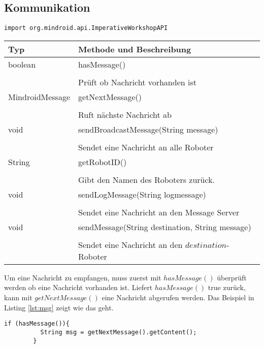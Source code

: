 	\subsection{Kommunikation}
				\begin{center}\texttt{import org.mindroid.api.ImperativeWorkshopAPI}\end{center}
		\begin{table}[htbp]
		\begin{tabular}{|p{} p{}|}
		\hline
		\textbf{Typ} & \textbf{Methode und Beschreibung} \\ \hline
		boolean & hasMessage() \\ 
				&\\
		& Prüft ob Nachricht vorhanden ist \\ \hline
		MindroidMessage & getNextMessage() \\ 
				&\\
		& Ruft nächste Nachricht ab \\ \hline		
		void & sendBroadcastMessage(String message) \\ 
				&\\
		& Sendet eine Nachricht an alle Roboter \\ \hline
		String & getRobotID() \\ 
				&\\
		& Gibt den Namen des Roboters zurück. \\ \hline
		void & sendLogMessage(String logmessage) \\ 
				&\\
		& Sendet eine Nachricht an den Message Server \\ \hline
		void & sendMessage(String destination, String message) \\ 
				&\\
		& Sendet eine Nachricht an den $destination$-Roboter \\ \hline
		\end{tabular}
		\end{table}
		
		Um eine Nachricht zu empfangen, muss zuerst mit $hasMessage()$ überprüft werden ob eine Nachricht vorhanden ist. Liefert $hasMessage()$ true zurück, kann mit $getNextMessage()$ eine Nachricht abgerufen werden. Das Beispiel in Listing \ref{lst:msg} zeigt wie das geht.
		
		\begin{lstlisting}[captionpos=b, caption=Beispiel zum Abrufen einer Nachricht, label=lst:msg]
		if (hasMessage()){
          String msg = getNextMessage().getContent();
        }
		\end{lstlisting}
		
